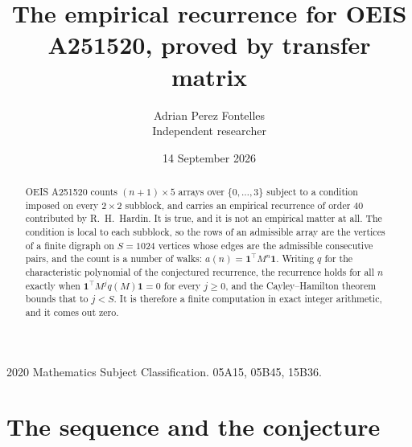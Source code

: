 \documentclass[11pt,a4paper]{article}
\title{The empirical recurrence for OEIS A251520, proved by transfer matrix}
\author{Adrian Perez Fontelles\\ \small Independent researcher}
\date{14 September 2026}
\theoremstyle{plain}
\theoremstyle{definition}
\begin{document}
\maketitle

\begin{abstract}
OEIS A251520 counts $(n+1)\times5$ arrays over $\{0,\dots,3\}$ subject to a condition imposed on
every $2\times2$ subblock, and carries an empirical recurrence of order $40$ contributed
by R.~H.~Hardin. It is true, and it is not an empirical matter at all. The condition is local
to each subblock, so the rows of an admissible array are the vertices of a finite digraph
on $S=1024$ vertices whose edges are the admissible consecutive pairs, and the count is a
number of walks: $a(n)=\mathbf{1}^{\!\top}M^{n}\mathbf{1}$. Writing $q$
for the characteristic polynomial of the conjectured recurrence, the recurrence holds for all
$n$ exactly when $\mathbf{1}^{\!\top}M^{j}q(M)\mathbf{1}=0$ for every $j\ge0$, and the
Cayley--Hamilton theorem bounds that to $j<S$. It is therefore a finite computation in exact
integer arithmetic, and it comes out zero.
\end{abstract}

\noindent\small 2020 Mathematics Subject Classification. 05A15, 05B45, 15B36.\normalsize

\section{The sequence and the conjecture}
\end{document}
